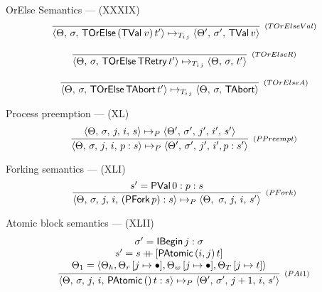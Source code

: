 \documentclass[14pt]{beamer}
\newcommand{\plus}{\mathbin{+\!\!\!+}}
\newcommand{\C}[1]{\red{\mathsf{#1}}}
\begin{document}
     \begin{frame}{OrElse Semantics --- (XXXIX)}
\begingroup
\everymath{\scriptstyle}
\large
\[
  \begin{array}{c}
     \infer[_{(TOrElseVal)}]
           { \langle \Theta,\,\sigma,\,\ensuremath{\C{TOrElse}}\,(\ensuremath{\C{TVal}}\:v)\,t'\rangle \mapsto_{T_{i\,j}}
             \langle \Theta',\,\sigma',\,\ensuremath{\C{TVal}}\,v \rangle }
           {  }
     \\ \\
     \infer[_{(TOrElseR)}]
           { \langle \Theta,\,\sigma,\,\ensuremath{\C{TOrElse}}\,\ensuremath{\C{TRetry}}\,t'\rangle \mapsto_{T_{i\,j}}
             \langle \Theta,\,\sigma,\,t' \rangle }
           { }
      \\ \\
     \infer[_{(TOrElseA)}]
           { \langle \Theta,\,\sigma,\,\ensuremath{\C{TOrElse}}\,\ensuremath{\C{TAbort}}\,t'\rangle \mapsto_{T_{i\,j}}
             \langle \Theta,\,\sigma,\,\ensuremath{\C{TAbort}} \rangle }
           {  }
  \end{array}
\]
\endgroup
     \end{frame}
     \begin{frame}{Process preemption --- (XL)}
\[
   \infer[_{(PPreempt)}]
         { \langle \Theta,\,\sigma,\,j,\,i,\,p : s\rangle \mapsto_{P}
           \langle \Theta',\,\sigma',\,j',\,i',p : s'\rangle }
         { \langle \Theta,\,\sigma,\,j,\,i,\,s\rangle \mapsto_{P}
           \langle \Theta',\,\sigma',\,j',\,i',\,s'\rangle } 
\]

     \end{frame}
     \begin{frame}{Forking semantics --- (XLI)}
\[
    \infer[_{(PFork)}]
          {\langle \Theta,\,\sigma,\,j,\,i,\, (\ensuremath{\C{PFork}}\,p) : s \rangle \mapsto_{P}
           \langle \Theta,\,\,\sigma,\,j,\,i,\, s' \rangle}
          {s' = \ensuremath{\C{PVal}}\,0 : p : s}
\]
     \end{frame}
     \begin{frame}{Atomic block semantics --- (XLII)}
\begingroup
\everymath{\scriptstyle}
\Large
\[
  \begin{array}{c}
  \infer[_{(PAt1)}]
        {\langle \Theta,\,\sigma,\,j,\,i,\,\ensuremath{\C{PAtomic}}\,\ensuremath{()}\,t : s\rangle\mapsto_{P}
         \langle \Theta',\,\sigma',\,j + 1,\,i,\, s'\rangle}
        {\begin{array}{c}
         \sigma' = \ensuremath{\C{IBegin}}\,j : \sigma\\
         s' = s \ensuremath{\plus } [\ensuremath{\C{PAtomic}}\,(i,j)\,t] \\
         \Theta_1 = \langle \Theta_h, \Theta_r\,[j\mapsto \bullet], \Theta_w\,[j\mapsto \bullet], \Theta_T\,[j\mapsto t]\rangle
         \end{array}}
  \end{array}      
\]
\endgroup
     \end{frame}
\end{document}
